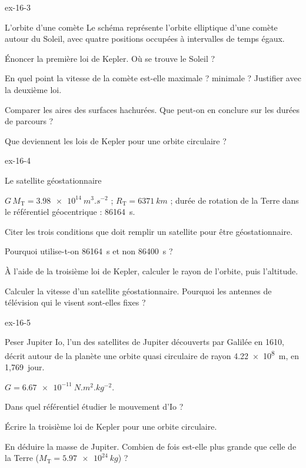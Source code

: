 \begin{blocLivre}{ex-16-3}
\begin{exercice}[1]{L'orbite d'une comète}
Le schéma représente l'orbite elliptique d'une comète autour du Soleil, avec quatre positions occupées à intervalles de
temps égaux.
\begin{questions}
\item Énoncer la première loi de Kepler. Où se trouve le Soleil ?
\item En quel point la vitesse de la comète est-elle maximale ? minimale ? Justifier avec la deuxième loi.
\item Comparer les aires des surfaces hachurées. Que peut-on en conclure sur les durées de parcours ?
\item Que deviennent les lois de Kepler pour une orbite circulaire ?
\end{questions}
\end{exercice}
\end{blocLivre}
\begin{blocLivre}{ex-16-4}
\begin{exercice}[1]{Le satellite géostationnaire}
\begin{donnees}
$G\,M_\mathrm{T}=\qty{3,98e14}{m^3.s^{-2}}$ ; $R_\mathrm{T}=\qty{6371}{km}$ ; durée de rotation de la Terre dans le référentiel
géocentrique : \qty{86164}{s}.
\end{donnees}
\begin{questions}
\item Citer les trois conditions que doit remplir un satellite pour être géostationnaire.
\item Pourquoi utilise-t-on \qty{86164}{s} et non \qty{86400}{s} ?
\item À l'aide de la troisième loi de Kepler, calculer le rayon de l'orbite, puis l'altitude.
\item Calculer la vitesse d'un satellite géostationnaire. Pourquoi les antennes de télévision qui le visent sont-elles
fixes ?
\end{questions}
\end{exercice}
\end{blocLivre}
\begin{blocLivre}{ex-16-5}
\begin{exercice}[1]{Peser Jupiter}
Io, l'un des satellites de Jupiter découverts par Galilée en 1610, décrit autour de la planète une orbite quasi circulaire
de rayon \qty{4,22e8}{m}, en 1,769~jour.
\begin{donnees}
$G=\qty{6,67e-11}{N.m^2.kg^{-2}}$.
\end{donnees}
\begin{questions}
\item Dans quel référentiel étudier le mouvement d'Io ?
\item Écrire la troisième loi de Kepler pour une orbite circulaire.
\item En déduire la masse de Jupiter. Combien de fois est-elle plus grande que celle de la Terre
($M_\mathrm{T}=\qty{5,97e24}{kg}$) ?
\end{questions}
\end{exercice}
\end{blocLivre}
